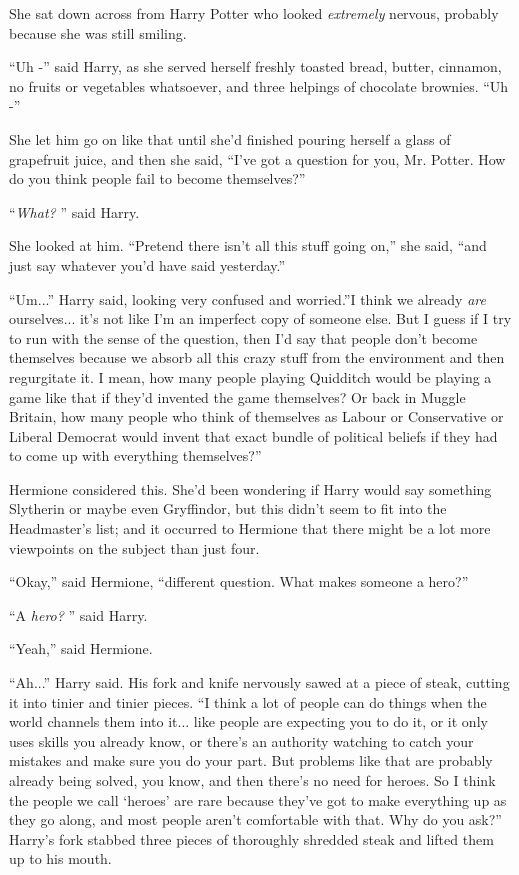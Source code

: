 She sat down across from Harry Potter who looked \emph{extremely}
nervous, probably because she was still smiling.

``Uh -'' said Harry, as she served herself freshly toasted bread,
butter, cinnamon, no fruits or vegetables whatsoever, and three helpings
of chocolate brownies. ``Uh -''

She let him go on like that until she'd finished pouring herself a glass
of grapefruit juice, and then she said, ``I've got a question for you,
Mr. Potter. How do you think people fail to become themselves?''

``\emph{What?} '' said Harry.

She looked at him. ``Pretend there isn't all this stuff going on,'' she
said, ``and just say whatever you'd have said yesterday.''

``Um...'' Harry said, looking very confused and worried.''I think
we already \emph{are} ourselves... it's not like I'm an imperfect
copy of someone else. But I guess if I try to run with the sense of the
question, then I'd say that people don't become themselves because we
absorb all this crazy stuff from the environment and then regurgitate
it. I mean, how many people playing Quidditch would be playing a game
like that if they'd invented the game themselves? Or back in Muggle
Britain, how many people who think of themselves as Labour or
Conservative or Liberal Democrat would invent that exact bundle of
political beliefs if they had to come up with everything themselves?''

Hermione considered this. She'd been wondering if Harry would say
something Slytherin or maybe even Gryffindor, but this didn't seem to
fit into the Headmaster's list; and it occurred to Hermione that there
might be a lot more viewpoints on the subject than just four.

``Okay,'' said Hermione, ``different question. What makes someone a
hero?''

``A \emph{hero?} '' said Harry.

``Yeah,'' said Hermione.

``Ah...'' Harry said. His fork and knife nervously sawed at a piece
of steak, cutting it into tinier and tinier pieces. ``I think a lot of
people can do things when the world channels them into it... like
people are expecting you to do it, or it only uses skills you already
know, or there's an authority watching to catch your mistakes and make
sure you do your part. But problems like that are probably already being
solved, you know, and then there's no need for heroes. So I think the
people we call `heroes' are rare because they've got to make everything
up as they go along, and most people aren't comfortable with that. Why
do you ask?'' Harry's fork stabbed three pieces of thoroughly shredded
steak and lifted them up to his mouth.

